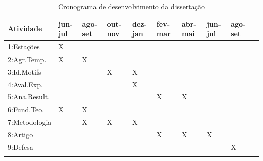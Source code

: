 \documentclass[12pt]{report} %
\begin{document}
\begin{table}[!ht]
	\centering
	\caption{Cronograma de desenvolvimento da dissertação}
	\begin{tabular}{ L{3cm} C{1cm} C{1cm} C{1cm} C{1cm} C{1cm} C{1cm} C{1cm} C{1cm} C{1cm} }
		\hline\noalign{\smallskip}
		Atividade & jun-jul  & ago-set & out-nov & dez-jan & fev-mar & abr-mai & jun-jul & ago-set \\
		\hline\noalign{\smallskip}
		1:Estações & X & & & & & & & \\
		2:Agr.Temp. & X & X & & & & & & \\
		3:Id.Motifs & & & X & X & & & & \\
		4:Aval.Exp. & & & & X & & & & \\
		5:Ana.Result. & & & & & X & X & & \\
		6:Fund.Teo.& X & X & & & & & & \\
		7:Metodologia & & X & X & X & & & & \\
		8:Artigo & & & & & X & X & X & \\
		9:Defesa & & & & & & & & X \\
		\hline\noalign{\smallskip}
	\end{tabular}
	\label{tbl:cronograma}
\end{table}

\label{bibpage}


\label{bibfinalpage}


\label{lastpage}
\end{document}
